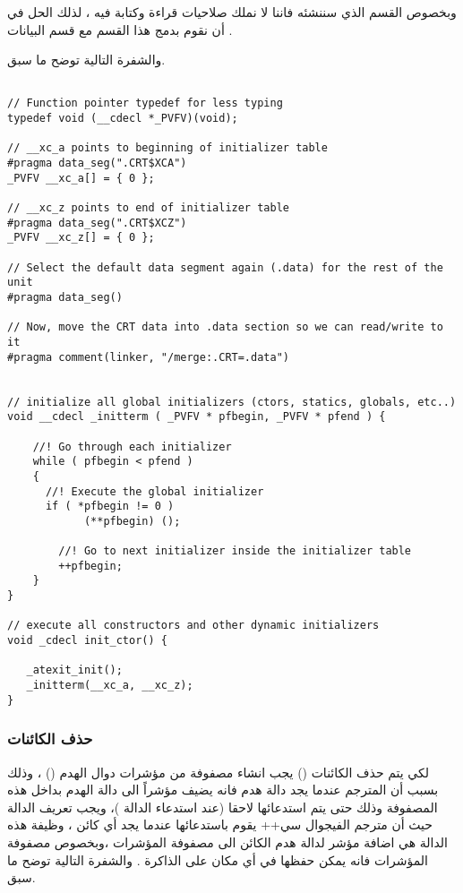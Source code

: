 \documentclass[document.tex]{subfiles}
\begin{document}
وبخصوص القسم  الذي سننشئه فاننا لا نملك صلاحيات قراءة وكتابة فيه ، لذلك الحل في أن نقوم بدمج هذا القسم مع قسم البيانات  .

والشفرة التالية توضح ما سبق.
 
\begin{english}

\lstset{numberstyle=\tiny,numbers=left,stepnumber=1,numbersep=5pt,tabsize=2,extendedchars=true,breaklines=true,frame=b,showspaces=false, showtabs=false,xleftmargin=10pt,framexleftmargin=10pt,framexrightmargin=5pt,framexbottommargin=4pt,showstringspaces=false,language=C++}

\begin{lstlisting}[label=objinit,caption=\en{Object Initializer}]

// Function pointer typedef for less typing
typedef void (__cdecl *_PVFV)(void);

// __xc_a points to beginning of initializer table
#pragma data_seg(".CRT$XCA")
_PVFV __xc_a[] = { 0 };

// __xc_z points to end of initializer table
#pragma data_seg(".CRT$XCZ")
_PVFV __xc_z[] = { 0 };

// Select the default data segment again (.data) for the rest of the unit
#pragma data_seg()

// Now, move the CRT data into .data section so we can read/write to it
#pragma comment(linker, "/merge:.CRT=.data")


// initialize all global initializers (ctors, statics, globals, etc..)
void __cdecl _initterm ( _PVFV * pfbegin, _PVFV * pfend ) {

	//! Go through each initializer
    while ( pfbegin < pfend )
    {
	  //! Execute the global initializer
      if ( *pfbegin != 0 )
            (**pfbegin) ();

	    //! Go to next initializer inside the initializer table
        ++pfbegin;
    }
}

// execute all constructors and other dynamic initializers
void _cdecl init_ctor() {

   _atexit_init();
   _initterm(__xc_a, __xc_z); 
}

\end{lstlisting}
\end{english}

\subsubsection{حذف الكائنات}
لكي يتم حذف الكائنات () يجب انشاء مصفوفة من مؤشرات دوال الهدم () ، وذلك بسبب أن المترجم عندما يجد دالة هدم فانه يضيف مؤشراً الى دالة الهدم بداخل هذه المصفوفة وذلك حتى يتم استدعائها لاحقا (عند استدعاء الدالة )، ويجب تعريف الدالة  حيث أن مترجم الفيجوال سي++ يقوم باستدعائها عندما يجد أي كائن ، وظيفة هذه الدالة هي اضافة مؤشر لدالة هدم الكائن الى مصفوفة المؤشرات ،وبخصوص مصفوفة المؤشرات فانه يمكن حفظها في أي مكان على الذاكرة . والشفرة التالية توضح ما سبق.
\end{document}
